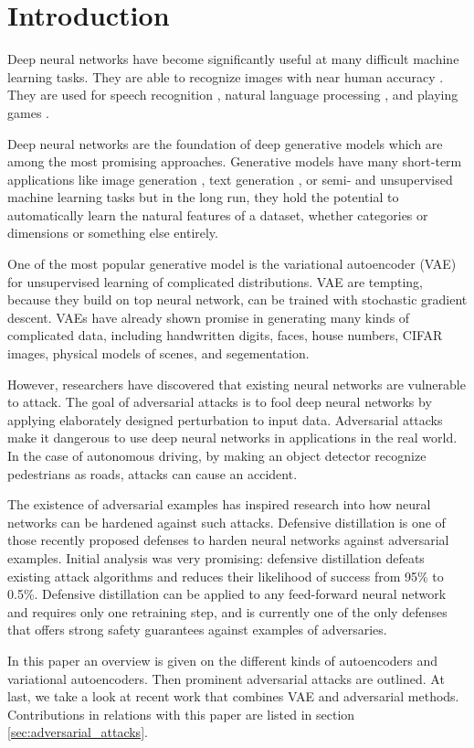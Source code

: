\section{Introduction}\label{sec:introduction}
Deep neural networks have become significantly useful at many difficult machine
learning tasks. They are able to recognize images with near human accuracy
\cite{lecun1998gradient}. They are used for speech recognition
\cite{hinton2012deep}, natural language processing \cite{andor2016globally}, and
playing games \cite{silver2016mastering}.

Deep neural networks are the foundation of deep generative models which are
among the most promising approaches. Generative models have many short-term
applications like image generation \cite{goodfellow2014generative}, text
generation \cite{semeniuta2017hybrid}, or semi- and unsupervised machine
learning tasks \cite{radford2015unsupervised}  but in the long run, they hold
the potential to automatically learn the natural features of a dataset, whether
categories or dimensions or something else entirely.

One of the most popular generative model is the variational autoencoder (VAE)
for unsupervised learning of complicated distributions. VAE are tempting,
because they build on top neural network, can be trained with stochastic
gradient descent. VAEs have already shown promise in generating many kinds of
complicated data, including handwritten digits, faces, house numbers, CIFAR
images, physical models of scenes, and segementation.

However, researchers have discovered that existing neural networks are
vulnerable to attack. The goal of adversarial attacks is to fool deep neural
networks by applying elaborately designed perturbation to input data.
Adversarial attacks make it dangerous to use deep neural networks in
applications in the real world. In the case of autonomous driving, by making an
object detector recognize pedestrians as roads, attacks can cause an accident.

The existence of adversarial examples has inspired research into how neural
networks can be hardened against such attacks. Defensive distillation is one of
those recently proposed defenses to harden neural networks against adversarial
examples. Initial analysis was very promising: defensive distillation defeats
existing attack algorithms and reduces their likelihood of success from 95\% to
0.5\%. Defensive distillation can be applied to any feed-forward neural network
and requires only one retraining step, and is currently one of the only defenses
that offers strong safety guarantees against examples of adversaries.

In this paper an overview is given on the different kinds of autoencoders and
variational autoencoders. Then prominent adversarial attacks are outlined. At
last, we take a look at recent work that combines VAE and adversarial methods.
Contributions in relations with this paper are listed in section
\ref{sec:adversarial_attacks}.